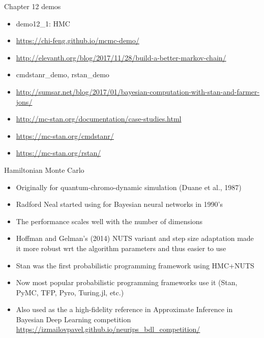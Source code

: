 \documentclass[finnish,english,t]{beamer}
\begin{document}
\begin{frame}{Chapter 12 demos}

  \begin{itemize}
  \item demo12\_1: HMC
  \item \url{https://chi-feng.github.io/mcmc-demo/}
  \item \url{http://elevanth.org/blog/2017/11/28/build-a-better-markov-chain/}
  \item cmdstanr\_demo, rstan\_demo
  \item \url{http://sumsar.net/blog/2017/01/bayesian-computation-with-stan-and-farmer-jons/}
  \item \url{http://mc-stan.org/documentation/case-studies.html}
  \item \url{https://mc-stan.org/cmdstanr/}
  \item \url{https://mc-stan.org/rstan/}
  \end{itemize}
  
\end{frame}

\begin{frame}{Hamiltonian Monte Carlo}

  \begin{itemize}
  \item<+-> Originally for quantum-chromo-dynamic simulation (Duane et
    al., 1987)
  \item<+-> Radford Neal started using for Bayesian neural networks in 1990's
  \item<+-> The performance scales well with the number of dimensions
  \item<+-> Hoffman and Gelman's (2014) NUTS variant and step size
    adaptation made it more robust wrt the algorithm parameters and
    thus easier to use
  \item<+-> Stan was the first probabilistic programming framework
    using HMC+NUTS
  \item<+-> Now most popular probabilistic programming frameworks use
    it (Stan, PyMC, TFP, Pyro, Turing.jl, etc.)
  \item<+-> Also used as the a high-fidelity reference in Approximate
    Inference in Bayesian Deep Learning competition
    \url{https://izmailovpavel.github.io/neurips_bdl_competition/}
  \end{itemize}
  
\end{frame}
\end{document}
